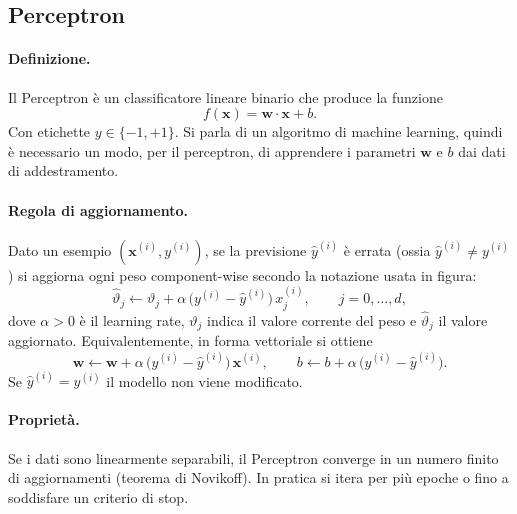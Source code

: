 \subsection{Perceptron}\label{subsec:perceptron}
\paragraph{Definizione.}
Il Perceptron è un classificatore lineare binario che produce la funzione
\[f(\mathbf{x})=\mathbf{w}\cdot\mathbf{x}+b.\]
Con etichette $y\in\{-1,+1\}$. Si parla di un algoritmo di machine learning, quindi è necessario un modo, per il perceptron, di apprendere i parametri $\mathbf{w}$ e $b$ dai dati di addestramento.

\paragraph{Regola di aggiornamento.}
Dato un esempio $(\mathbf{x}^{(i)},y^{(i)})$, se la previsione $\hat{y}^{(i)}$ è errata (ossia $\hat{y}^{(i)}\neq y^{(i)}$) si aggiorna ogni peso component-wise secondo la notazione usata in figura:
\[
\hat{\vartheta}_j \leftarrow \vartheta_j + \alpha\,\bigl(y^{(i)}-\hat{y}^{(i)}\bigr)\,x_j^{(i)},\qquad j=0,\dots,d,
\]
dove $\alpha>0$ è il learning rate, $\vartheta_j$ indica il valore corrente del peso e $\hat{\vartheta}_j$ il valore aggiornato. Equivalentemente, in forma vettoriale si ottiene
\[
\mathbf{w}\leftarrow \mathbf{w} + \alpha\,\bigl(y^{(i)}-\hat{y}^{(i)}\bigr)\,\mathbf{x}^{(i)},\qquad b\leftarrow b + \alpha\,\bigl(y^{(i)}-\hat{y}^{(i)}\bigr).
\]
Se $\hat{y}^{(i)}=y^{(i)}$ il modello non viene modificato.

\paragraph{Proprietà.}
Se i dati sono linearmente separabili, il Perceptron converge in un numero finito di aggiornamenti (teorema di Novikoff). In pratica si itera per più epoche o fino a soddisfare un criterio di stop.

